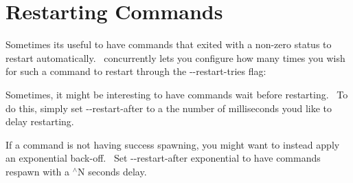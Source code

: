 \chapter{Restarting Commands }
\hypertarget{md__c_1_2xampp_2htdocs_2_g_pagos_ayuntamiento_2node__modules_2concurrently_2docs_2cli_2restarting}{}\label{md__c_1_2xampp_2htdocs_2_g_pagos_ayuntamiento_2node__modules_2concurrently_2docs_2cli_2restarting}
\label{md__c_1_2xampp_2htdocs_2_g_pagos_ayuntamiento_2node__modules_2concurrently_2docs_2cli_2restarting_autotoc_md2252}%
%


Sometimes it\textquotesingle{}s useful to have commands that exited with a non-\/zero status to restart automatically.~\newline
 concurrently lets you configure how many times you wish for such a command to restart through the {\ttfamily -\/-\/restart-\/tries} flag\+:


\begin{DoxyCode}{0}

\end{DoxyCode}


Sometimes, it might be interesting to have commands wait before restarting.~\newline
 To do this, simply set {\ttfamily -\/-\/restart-\/after} to a the number of milliseconds you\textquotesingle{}d like to delay restarting.


\begin{DoxyCode}{0}

\end{DoxyCode}


If a command is not having success spawning, you might want to instead apply an exponential back-\/off.~\newline
 Set {\ttfamily -\/-\/restart-\/after exponential} to have commands respawn with a {\texorpdfstring{$^\wedge$}{\string^}N} seconds delay.


